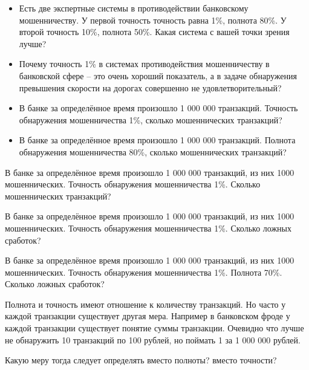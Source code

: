   \begin{frame}
  \small
  \begin{itemize}
  	\item Есть две экспертные системы в противодействии банковскому мошенничеству. 
  	У первой точность точность равна 1\%, полнота 80\%. 
  	У второй точность 10\%, полнота 50\%. 
  	Какая система с вашей точки зрения лучше?
  	\item Почему точность 1\% в системах противодействия мошенничеству в банковской сфере -- это очень хороший показатель, а
  	в задаче обнаружения превышения скорости на дорогах совершенно не удовлетворительный? 
  	\item В банке за определённое время произошло 1 000 000 транзакций. Точность обнаружения мошенничества 1\%, сколько мошеннических транзакций?
  	\item В банке за определённое время произошло 1 000 000 транзакций. Полнота обнаружения мошенничества 80\%, сколько мошеннических транзакций?
  \end{itemize}

  \end{frame}

\begin{frame}
	В банке за определённое время произошло 1 000 000 транзакций, из них 1000 мошеннических. Точность обнаружения мошенничества 1\%. Сколько мошеннических транзакций?
\end{frame}

\begin{frame}
	В банке за определённое время произошло 1 000 000 транзакций, из них 1000 мошеннических. Точность обнаружения мошенничества 1\%.  Сколько ложных сработок?
\end{frame}

\begin{frame}
	В банке за определённое время произошло 1 000 000 транзакций, из них 1000 мошеннических. Точность обнаружения мошенничества 1\%. Полнота 70\%. Сколько ложных сработок?
\end{frame}

\begin{frame}
	Полнота и точность имеют отношение к количеству транзакций. Но часто у каждой транзакции существует другая мера. Например в банковском фроде у каждой транзакции существует понятие суммы транзакции. Очевидно что лучше не обнаружить 10 транзакций по 100 рублей, но поймать 1 за 1 000 000 рублей. 
	
	Какую меру тогда следует определять вместо полноты? вместо точности?
\end{frame}


